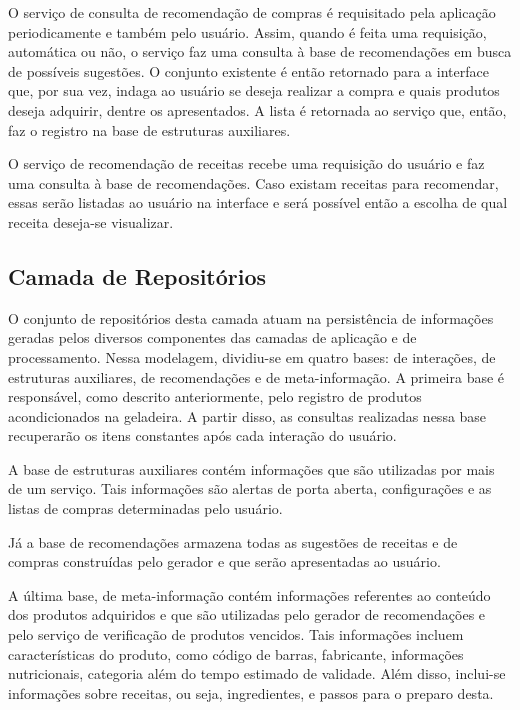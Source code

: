 
O serviço de consulta de recomendação de compras é requisitado pela aplicação periodicamente e também pelo usuário. Assim, quando é feita uma requisição, automática ou não, o serviço faz uma consulta à base de recomendações em busca de possíveis sugestões. O conjunto existente é então retornado para a interface que, por sua vez, indaga ao usuário se deseja realizar a compra e quais produtos deseja adquirir, dentre os apresentados. A lista é retornada ao serviço que, então, faz o registro na base de estruturas auxiliares.


O serviço de recomendação de receitas recebe uma requisição do usuário e faz uma consulta à base de recomendações. Caso existam receitas para recomendar, essas serão listadas ao usuário na interface e será possível então a escolha de qual receita deseja-se visualizar.


\subsection{Camada de Repositórios} \label{sec:camada-repo}

O conjunto de repositórios desta camada atuam na persistência de informações geradas pelos diversos componentes das camadas de aplicação e de processamento. Nessa modelagem, dividiu-se em quatro bases: de interações, de estruturas auxiliares, de recomendações e de meta-informação.
A primeira base é responsável, como descrito anteriormente, pelo registro de produtos acondicionados na geladeira. A partir disso, as consultas realizadas nessa base recuperarão os itens constantes após cada interação do usuário.

A base de estruturas auxiliares contém informações que são utilizadas por mais de um serviço. Tais informações são alertas de porta aberta, configurações e as listas de compras determinadas pelo usuário. 

Já a base de recomendações armazena todas as sugestões de receitas e de compras construídas pelo gerador e que serão apresentadas ao usuário.

A última base, de meta-informação contém informações referentes ao conteúdo dos produtos adquiridos e que são utilizadas pelo gerador de recomendações e pelo serviço de verificação de produtos vencidos. Tais informações incluem características do produto, como código de barras, fabricante, informações nutricionais, categoria além do tempo estimado de validade. Além disso, inclui-se informações sobre receitas, ou seja, ingredientes, e passos para o preparo desta.

